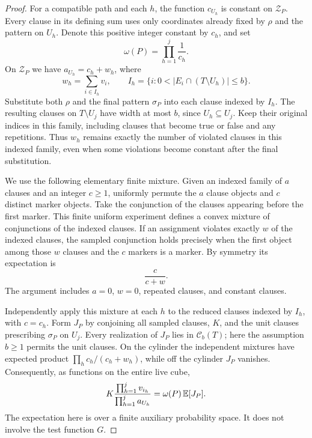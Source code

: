 \begin{proof}
For a compatible path and each $h$, the function $c_{U_h}$ is constant on
$\mathcal Z_P$.  Every clause in its defining sum uses only coordinates
already fixed by $\rho$ and the pattern on $U_h$.  Denote this positive
integer constant by $c_h$, and set
\begin{equation}\label{eq:restriction-path-weight}
    \omega(P)=\prod_{h=1}^{j}\frac{1}{c_h}.
\end{equation}
On $\mathcal Z_P$ we have $a_{U_h}=c_h+w_h$, where
\[
 w_h=\sum_{i\in I_h}v_i,
 \qquad
 I_h=\{i:0<|E_i\cap(T\setminus U_h)|\leq b\}.
\]
Substitute both $\rho$ and the final pattern $\sigma_P$ into each clause
indexed by $I_h$.  The resulting clauses on $T\setminus U_j$ have width
at most $b$, since $U_h\subseteq U_j$.  Keep their original indices in this
family, including clauses that become true or false and any repetitions.
Thus $w_h$ remains exactly the number of violated clauses in this indexed
family, even when some violations become constant after the final
substitution.

We use the following elementary finite mixture.  Given an indexed family
of $a$ clauses and an integer $c\geq1$, uniformly permute the $a$ clause objects
and $c$ distinct marker objects.  Take the conjunction of the clauses
appearing before the first marker.  This finite uniform experiment
defines a convex mixture of conjunctions of the indexed clauses.
If an assignment violates exactly $w$ of the indexed clauses, the sampled
conjunction holds precisely when the first object among those $w$ clauses
and the $c$ markers is a marker.  By symmetry its expectation is
\begin{equation}\label{eq:restriction-mixture-ratio}
       \frac{c}{c+w}.
\end{equation}
The argument includes $a=0$, $w=0$, repeated clauses, and constant clauses.

Independently apply this mixture at each $h$ to the reduced clauses
indexed by $I_h$, with $c=c_h$.  Form $J_P$ by conjoining all sampled
clauses, $K$, and the unit clauses prescribing $\sigma_P$ on $U_j$.
Every realization of $J_P$ lies in $\mathcal C_b(T)$; here the assumption
$b\geq1$ permits the unit clauses.  On the cylinder the independent
mixtures have expected product $\prod_h c_h/(c_h+w_h)$, while off the
cylinder $J_P$ vanishes.  Consequently, as functions on the entire live
cube,
\begin{equation}\label{eq:restriction-path-mixture}
   K\frac{\prod_{h=1}^{j}v_{i_h}}
           {\prod_{h=1}^{j}a_{U_h}}
          =\omega(P)\,\mathbb E[J_P].
\end{equation}
The expectation here is over a finite auxiliary probability space.  It
does not involve the test function $G$.


\end{proof}
